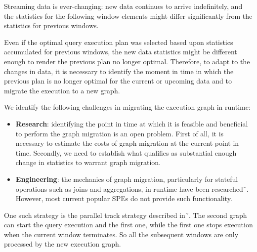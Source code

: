 Streaming data is ever-changing: new data continues to arrive indefinitely, and the statistics for the following window elements might differ significantly from the statistics for previous windows. 

Even if the optimal query execution plan was selected based upon statistics accumulated for previous windows, the new data statistics might be different enough to render the previous plan no longer optimal. Therefore, to adapt to the changes in data, it is necessary to identify the moment in time in which the previous plan is no longer optimal for the current or upcoming data and to migrate the execution to a new graph. 

We identify the following challenges in migrating the execution graph in runtime:
\begin{itemize}
 \item \textbf{Research}: identifying the point in time at which it is feasible and beneficial to perform the graph migration is an open problem. First of all, it is necessary to estimate the costs of graph migration at the current point in time. Secondly, we need to establish what qualifies as substantial enough change in statistics to warrant graph migration. 

 \item \textbf{Engineering}: 
    the mechanics of graph migration, particularly for stateful operations such as joins and aggregations, in runtime have been researched˜\cite{zhu2004dynamic}.
 However, most current popular SPEs do not provide such functionality. 
   \end{itemize}
One such strategy is the parallel track strategy described in˜\cite{zhu2004dynamic}. 
The second graph can start the query execution and the first one, while the first one stops execution when the current window terminates. So all the subsequent windows are only processed by the new execution graph.

